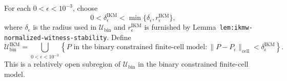 For each \(0<\epsilon<10^{-3}\), choose
\[
 0<\delta_\epsilon^{\mathrm{IKM}}
 <\min\{\delta_\epsilon,r_\epsilon^{\mathrm{IKM}}\},
\]
where \(\delta_\epsilon\) is the radius used in \(\mathcal U_{\mathrm{bin}}\) and \(r_\epsilon^{\mathrm{IKM}}\) is furnished by Lemma~\texttt{lem:ikmw-normalized-witness-stability}. Define
\[
 \mathcal U_{\mathrm{bin}}^{\mathrm{IKM}}
 =\bigcup_{0<\epsilon<10^{-3}}
 \left\{P\text{ in the binary constrained finite-cell model}:
 \|P-P_\epsilon\|_{\mathrm{cell}}<\delta_\epsilon^{\mathrm{IKM}}\right\}.
\]
This is a relatively open subregion of \(\mathcal U_{\mathrm{bin}}\) in the binary constrained finite-cell model.
